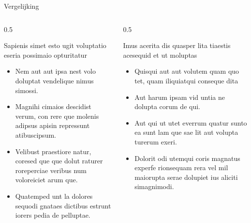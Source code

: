 \documentclass[department=none, notes={show notes}, slidesperpage=4, official=true, handout]{beamerruhuisstijl}
\begin{document}
\begin{frame}{Vergelijking}  
    \begin{columns}[T,totalwidth=\linewidth]
        \begin{column}{0.5\textwidth}
            \begin{block}{Sapienis simet esto ugit voluptatio eseria possimaio opturitatur}
                \begin{itemize}
                    \item Nem aut aut ipsa nest volo doluptat vendelique nimus simossi.
                    \item Magnihi cimaios descidist verum, con rere que molenis adipsus apisin repressunt atibuscipsum.
                    \item Velibust praestiore natur, coresed que que dolut raturer roreperciae veribus num voloreiciet arum que.
                    \item Quatemped unt la dolores sequodi gnataes dictibus estrunt iorers pedia de pelluptae.
                \end{itemize}
            \end{block}
        \end{column}
        \begin{column}{0.5\textwidth}
            \begin{block}{Imus acerita dis quasper lita tiaestis acesequid et ut moluptas}
                \begin{itemize}
                    \item Quisqui aut aut volutem quam quo tet, quam iliquiatqui conseque dita
                    \item Aut harum ipsam vid untia ne dolupta corum de qui.
                    \item Aut qui ut utet everrum quatur sunto ea sunt lam que sae lit aut volupta turerum exeri.
                    \item Dolorit odi utemqui coris magnatus experfe rionsequam rera vel mil maiorupta serae dolupiet ius aliciti simagnimodi.
                \end{itemize}
            \end{block}
        \end{column}
    \end{columns}
\end{frame}
\end{document}
